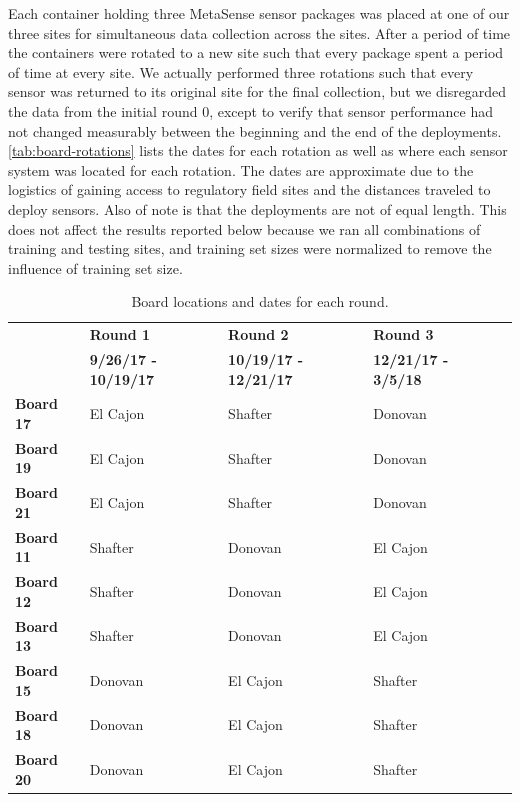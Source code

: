 \documentclass[journal abbreviation, manuscript]{copernicus}
\begin{document}
Each container holding three MetaSense sensor packages was placed at one of our three sites for simultaneous data collection across the sites.  After a period of time the containers were rotated to a new site such that every package spent a period of time at every site.  We actually performed three rotations such that every sensor was returned to its original site for the final collection, but we disregarded the data from the initial round 0, except to verify that sensor performance had not changed measurably between the beginning and the end of the deployments. \autoref{tab:board-rotations} lists the dates for each rotation as well as where each sensor system was located for each rotation.  The dates are approximate due to the logistics of gaining access to regulatory field sites and the distances traveled to deploy sensors.  Also of note is that the deployments are not of equal length.  This does not affect the results reported below because we ran all combinations of training and testing sites, and training set sizes were normalized to remove the influence of training set size.

\begin{table}[H]
\centering
\caption{Board locations and dates for each round.}
\begin{tabular}{l|llll}
                  & \textbf{Round 1} &            \textbf{Round 2} &                   \textbf{Round 3} \\
         & \textbf{9/26/17 - 10/19/17} & \textbf{10/19/17 - 12/21/17} & \textbf{12/21/17 - 3/5/18} \\ \hline
\textbf{Board 17} & El Cajon    & Shafter      & Donovan    \\
\textbf{Board 19} &  El Cajon    & Shafter     & Donovan   \\
\textbf{Board 21} &  El Cajon    & Shafter     & Donovan  \\ \hline
\textbf{Board 11} &  Shafter      & Donovan  & El Cajon  \\
\textbf{Board 12} &  Shafter      & Donovan  & El Cajon  \\
\textbf{Board 13} &  Shafter      & Donovan  & El Cajon  \\ \hline
\textbf{Board 15} &  Donovan   & El Cajon   & Shafter    \\
\textbf{Board 18} &  Donovan   & El Cajon   & Shafter     \\
\textbf{Board 20} &  Donovan   & El Cajon   & Shafter   
\end{tabular}
\label{tab:board-rotations}
\end{table}
\end{document}
